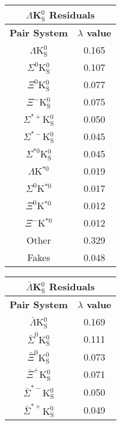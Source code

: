 \documentclass[ALICE,manyauthors]{cernphprep}
\begin{document}
\begin{table}[htbp]
 \centering
 \begin{minipage}{0.3\textwidth}
  \centering 
  \begin{tabular}{|c|c|}
   \multicolumn{2}{c}{$\Lambda$K$^{0}_{\mathrm{S}}$ Residuals} \\
   \hline
   \textbf{Pair System} & \textbf{$\lambda$ value} \\
   \hline
   $\Lambda$K$^{0}_{\mathrm{S}}$ & 0.165 \\
   $\Sigma^{0}$K$^{0}_{\mathrm{S}}$ & 0.107 \\
   $\Xi^{0}$K$^{0}_{\mathrm{S}}$ & 0.077 \\
   $\Xi^{-}$K$^{0}_{\mathrm{S}}$ & 0.075 \\
   $\Sigma^{*+}$K$^{0}_{\mathrm{S}}$ & 0.050 \\
   $\Sigma^{*-}$K$^{0}_{\mathrm{S}}$ & 0.045 \\
   $\Sigma^{*0}$K$^{0}_{\mathrm{S}}$ & 0.045 \\
   $\Lambda$K$^{*0}$ & 0.019 \\
   $\Sigma^{0}$K$^{*0}$ & 0.017 \\
   $\Xi^{0}$K$^{*0}$ & 0.012 \\
   $\Xi^{-}$K$^{*0}$ & 0.012 \\
   Other & 0.329 \\
   Fakes & 0.048 \\
   \hline
  \end{tabular}
 \end{minipage} 
 \begin{minipage}{0.3\textwidth}
  \centering 
  \begin{tabular}{|c|c|}
   \multicolumn{2}{c}{$\bar{\Lambda}$K$^{0}_{\mathrm{S}}$ Residuals} \\
   \hline
   \textbf{Pair System} & \textbf{$\lambda$ value} \\
   \hline
   $\bar{\Lambda}$K$^{0}_{\mathrm{S}}$ & 0.169 \\
   $\bar{\Sigma}^{0}$K$^{0}_{\mathrm{S}}$ & 0.111 \\
   $\bar{\Xi}^{0}$K$^{0}_{\mathrm{S}}$ & 0.073 \\
   $\bar{\Xi}^{+}$K$^{0}_{\mathrm{S}}$ & 0.071 \\
   $\bar{\Sigma}^{*-}$K$^{0}_{\mathrm{S}}$ & 0.050 \\
   $\bar{\Sigma}^{*+}$K$^{0}_{\mathrm{S}}$ & 0.049 \\

\end{tabular}
\end{minipage}
\end{table}
\end{document}
